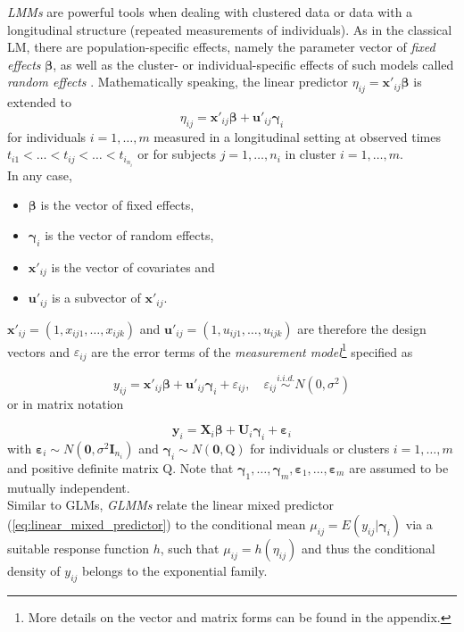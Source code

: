 \textit{\acp{LMM}} are powerful tools when dealing with clustered data or data with a longitudinal structure (repeated measurements of individuals).
As in the classical \ac{LM}, there are population-specific effects, namely the parameter vector of \textit{fixed effects} $\boldsymbol{\beta}$, as well as the cluster- or individual-specific effects of such models called \textit{random effects} \citep{fahrmeir2003regression}. 
Mathematically speaking, the linear predictor $\eta_{ij}= \mathbf{x}'_{ij} \mathbf{\beta} $ is extended to
\begin{equation}
\eta_{ij} = \bm{{x'}}_{ij} \bm{\beta} + \bm{u'}_{ij}\bm{\gamma}_i  
\label{eq:linear_mixed_predictor}
\end{equation}
for individuals $i=1, \ldots, m$ measured in a longitudinal setting at observed times $t_{i1} < \ldots < t_{ij} < \ldots < t_{i_{n_i}}$
or for subjects $j=1, \ldots, n_i$ in cluster $i=1, \ldots, m$. \\
In any case,
\begin{itemize}
\item $\bm{\beta}$ is the vector of fixed effects,
\item $\bm{\gamma}_i$ is the vector of random effects,
\item $\bm{x'}_{ij}$ is the vector of covariates and
\item $\bm{u'}_{ij}$ is a subvector of $\bm{x'}_{ij}$.
\end{itemize}


$\bm{x'}_{ij} = (1, x_{ij1}, \ldots, x_{ijk}) $ and $ \bm{u'}_{ij} = (1, u_{ij1}, \ldots, u_{ijk}) $ are therefore the design vectors and $\varepsilon_{ij}$ are the error terms of the \textit{measurement model}\footnote{More details on the vector and matrix forms can be found in the appendix.} specified as

\begin{equation}
y_{ij} =  \bm{x'}_{ij} \bm{\beta} + \bm{u'}_{ij} \bm{\gamma}_i + \varepsilon_{ij}, \quad \varepsilon_{i j} \overset{i.i.d.} \sim N\left(0, \sigma^{2}\right) 
\end{equation}
or in matrix notation

\begin{equation}
\bm{y}_{i}=\bm{X}_{i} \bm{\beta} + \bm{U}_{i} \bm{\gamma}_{i} + \bm{\varepsilon}_{i}
\end{equation}
with $ \bm{\varepsilon}_{i} \sim N (\bm{0}, \sigma^2 {\bm{I}}_{n_{i}})$ and $ \bm{\gamma}_{i} \sim N (\bm{0}, \bm{\mathrm{Q}})$ for individuals or clusters $ i=1, \ldots, m $ and positive definite matrix $\bm{\mathrm{Q}}$. Note that $\bm{\gamma}_1, \ldots, \bm{\gamma}_m, \bm{\varepsilon}_1, \ldots, \bm{\varepsilon}_m$ are assumed to be mutually independent. \\

Similar to \acp{GLM}, \textit{\acp{GLMM}} relate the linear mixed predictor (\autoref{eq:linear_mixed_predictor}) to the conditional mean 
$ \mu_{ij} = E(y_{ij} | \bm{\gamma}_{i}) $
via a suitable response function $h$, such that
$ \mu_{ij} = h(\eta_{ij}) $ and thus the conditional density of $y_{ij}$ belongs to the exponential family.